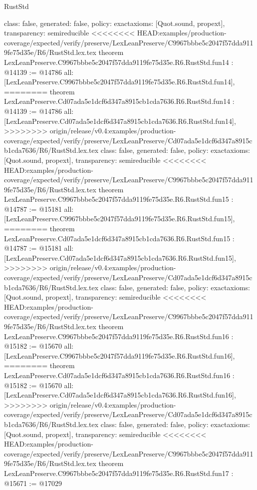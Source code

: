 \begin{lexlean}{RustStd}
\begin{coremodule}
{\begin{coremodule}
{{{{{{{{{{{{{{{{{  class: false,
  generated: false,
  policy: exact{axioms: [Quot.sound, propext]},
  transparency: semireducible
}
<<<<<<<< HEAD:examples/production-coverage/expected/verify/preserve/LexLeanPreserve/C9967bbbe5c2047f57dda9119fe75d35e/R6/RustStd.lex.tex
theorem LexLeanPreserve.C9967bbbe5c2047f57dda9119fe75d35e.R6.RustStd.fun14 : @14139 := @14786 {
  all: [LexLeanPreserve.C9967bbbe5c2047f57dda9119fe75d35e.R6.RustStd.fun14],
========
theorem LexLeanPreserve.Cd07ada5e1dcf6d347a8915cb1cda7636.R6.RustStd.fun14 : @14139 := @14786 {
  all: [LexLeanPreserve.Cd07ada5e1dcf6d347a8915cb1cda7636.R6.RustStd.fun14],
>>>>>>>> origin/release/v0.4:examples/production-coverage/expected/verify/preserve/LexLeanPreserve/Cd07ada5e1dcf6d347a8915cb1cda7636/R6/RustStd.lex.tex
  class: false,
  generated: false,
  policy: exact{axioms: [Quot.sound, propext]},
  transparency: semireducible
}
<<<<<<<< HEAD:examples/production-coverage/expected/verify/preserve/LexLeanPreserve/C9967bbbe5c2047f57dda9119fe75d35e/R6/RustStd.lex.tex
theorem LexLeanPreserve.C9967bbbe5c2047f57dda9119fe75d35e.R6.RustStd.fun15 : @14787 := @15181 {
  all: [LexLeanPreserve.C9967bbbe5c2047f57dda9119fe75d35e.R6.RustStd.fun15],
========
theorem LexLeanPreserve.Cd07ada5e1dcf6d347a8915cb1cda7636.R6.RustStd.fun15 : @14787 := @15181 {
  all: [LexLeanPreserve.Cd07ada5e1dcf6d347a8915cb1cda7636.R6.RustStd.fun15],
>>>>>>>> origin/release/v0.4:examples/production-coverage/expected/verify/preserve/LexLeanPreserve/Cd07ada5e1dcf6d347a8915cb1cda7636/R6/RustStd.lex.tex
  class: false,
  generated: false,
  policy: exact{axioms: [Quot.sound, propext]},
  transparency: semireducible
}
<<<<<<<< HEAD:examples/production-coverage/expected/verify/preserve/LexLeanPreserve/C9967bbbe5c2047f57dda9119fe75d35e/R6/RustStd.lex.tex
theorem LexLeanPreserve.C9967bbbe5c2047f57dda9119fe75d35e.R6.RustStd.fun16 : @15182 := @15670 {
  all: [LexLeanPreserve.C9967bbbe5c2047f57dda9119fe75d35e.R6.RustStd.fun16],
========
theorem LexLeanPreserve.Cd07ada5e1dcf6d347a8915cb1cda7636.R6.RustStd.fun16 : @15182 := @15670 {
  all: [LexLeanPreserve.Cd07ada5e1dcf6d347a8915cb1cda7636.R6.RustStd.fun16],
>>>>>>>> origin/release/v0.4:examples/production-coverage/expected/verify/preserve/LexLeanPreserve/Cd07ada5e1dcf6d347a8915cb1cda7636/R6/RustStd.lex.tex
  class: false,
  generated: false,
  policy: exact{axioms: [Quot.sound, propext]},
  transparency: semireducible
}
<<<<<<<< HEAD:examples/production-coverage/expected/verify/preserve/LexLeanPreserve/C9967bbbe5c2047f57dda9119fe75d35e/R6/RustStd.lex.tex
theorem LexLeanPreserve.C9967bbbe5c2047f57dda9119fe75d35e.R6.RustStd.fun17 : @15671 := @17029 {
}}}}}}}}}}}}}}}}}}}}
\end{coremodule}}
\end{coremodule}
\end{lexlean}
